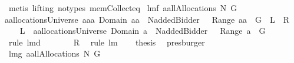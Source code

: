 \begin{isabellebody}
%
\isadelimproof
%
\endisadelimproof
%
\isatagproof
{}\isamarkupfalse%
\ {\isacharparenleft}metis\ {\isacharparenleft}lifting{\isacharcomma}\ no{\isacharunderscore}types{\isacharparenright}\ mem{\isacharunderscore}Collect{\isacharunderscore}eq{\isacharparenright}%
\endisatagproof
{\isafoldproof}%
%
\isadelimproof
\isanewline
%
\endisadelimproof
\isanewline
{}\isamarkupfalse%
\ lm{}{}f{\isacharcolon}\ {\isachardoublequoteopen}{\isacharparenleft}a{\isasymin}allAllocations{\isacharprime}{\isacharprime}{\isacharprime}\ N\ G{\isacharparenright}{\isacharequal}\isanewline
{\isacharparenleft}a{\isasymin}allocationsUniverse{\isacharampersand}\ a{\isasymin}{\isacharbraceleft}aa{\isachardot}\ Domain\ aa\ {\isasymsubseteq}\ N{\isacharminus}{\isacharbraceleft}addedBidder{\isacharprime}{\isacharbraceright}\ {\isacharampersand}\ {\isasymUnion}\ Range\ aa\ {\isasymsubseteq}\ G{\isacharbraceright}{\isacharparenright}{\isachardoublequoteclose}\ {\isacharparenleft}\ {\isachardoublequoteopen}{\isacharquery}L\ {\isacharequal}\ {\isacharquery}R{\isachardoublequoteclose}{\isacharparenright}\ \isanewline
%
\isadelimproof
%
\endisadelimproof
%
\isatagproof
{}\isamarkupfalse%
\ {\isacharminus}\isanewline
\ \ \isamarkupfalse%
\ {\isachardoublequoteopen}{\isacharquery}L\ {\isacharequal}\ {\isacharparenleft}a{\isasymin}allocationsUniverse{\isacharampersand}\ Domain\ a\ {\isasymsubseteq}\ N{\isacharminus}{\isacharbraceleft}addedBidder{\isacharprime}{\isacharbraceright}\ {\isacharampersand}\ {\isasymUnion}\ Range\ a\ {\isasymsubseteq}\ G{\isacharparenright}{\isachardoublequoteclose}\ \isamarkupfalse%
\ {\isacharparenleft}rule\ lm{}{}d{\isacharparenright}\isanewline
\ \ \isamarkupfalse%
\ \isamarkupfalse%
\ {\isachardoublequoteopen}{\isachardot}{\isachardot}{\isachardot}\ {\isacharequal}\ {\isacharquery}R{\isachardoublequoteclose}\ \isamarkupfalse%
\ {\isacharparenleft}rule\ lm{}{}{\isacharparenright}\ \isamarkupfalse%
\ \isamarkupfalse%
\ {\isacharquery}thesis\ \isamarkupfalse%
\ presburger\isanewline
{}\isamarkupfalse%
%
\endisatagproof
{\isafoldproof}%
%
\isadelimproof
\isanewline
%
\endisadelimproof
\isanewline
{}\isamarkupfalse%
\ lm{}{}g{\isacharcolon}\ {\isachardoublequoteopen}a{\isasymin}allAllocations{\isacharprime}{\isacharprime}{\isacharprime}\ N\ G{\isacharequal}\isanewline

\end{isabellebody}
